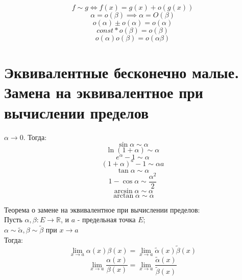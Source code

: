 \documentclass[11pt, a4paper, utf-8]{article}
\def\R{\mathbb{R}}
\begin{document}
    $$f \sim g \iff f(x) = g(x) + o(g(x))$$
    $$\alpha = o(\beta) \implies \alpha = O(\beta)$$
    $$o(\alpha) \pm o(\alpha) = o(\alpha)$$
    $$const * o(\beta) = o(\beta)$$
    $$o(\alpha)o(\beta) = o(\alpha \beta)$$
    

    \section{Эквивалентные бесконечно малые. Замена на эквивалентное при вычислении пределов}
    $\alpha \to 0$. Тогда:
    $$\sin \alpha \sim \alpha$$
    $$\ln (1 + \alpha) \sim \alpha$$
    $$e^{\alpha} - 1 \sim \alpha$$
    $$(1 + \alpha)^a - 1 \sim \alpha a$$
    $$\tan \alpha \sim \alpha$$
    $$1 - \cos \alpha \sim \frac{\alpha ^2}{2}$$
    $$\arcsin \alpha \sim \alpha$$
    $$\arctan \alpha \sim \alpha$$

    Теорема о замене на эквивалентное при вычислении пределов:\\
    Пусть $\alpha , \beta : E \to \R$, и $a$ - предельная точка $E$;\\
    $\alpha \sim \tilde{\alpha}, \beta \sim \tilde{\beta}$ при $x \to a$\\
    Тогда:
    $$\lim_{x \to a} \alpha (x) \beta (x) = \lim_{x \to a} \tilde{\alpha} (x) \tilde{\beta} (x)$$
    $$\lim_{x \to a} \frac{\alpha (x)}{\beta (x)} = \lim_{x \to a} \frac{\tilde{\alpha} (x)}{\tilde{\beta} (x)}$$
\end{document}
